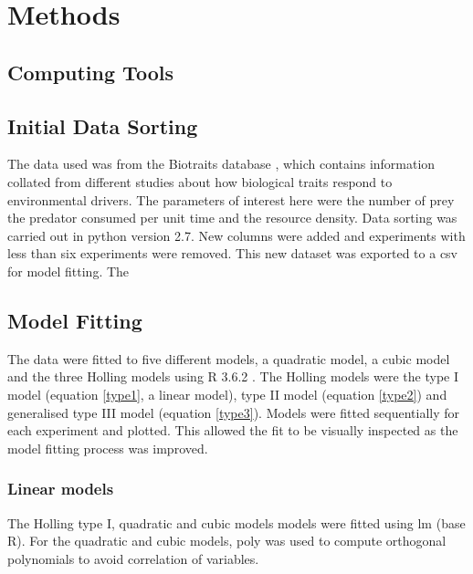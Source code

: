 \documentclass{article}
\begin{document}
%
%
\section{Methods}
\subsection{Computing Tools}
\subsection{Initial Data Sorting}
The data used was from the Biotraits database \parencite{Dell2013}, which contains information collated from different studies about how biological traits respond to environmental drivers. The parameters of interest here were the number of prey the predator consumed per unit time and the resource density. Data sorting was carried out in python version 2.7. New columns were added and experiments with less than six experiments were removed. This new dataset was exported to a csv for model fitting. The
\subsection{Model Fitting}
The data were fitted to five different models, a quadratic model, a cubic model and the three Holling models \parencite{Holling1959} using R 3.6.2 \parencite{RCoreTeam2017}. The Holling models were the type I model (equation \ref{type1}, a linear model), type II model (equation \ref{type2}) and generalised type III model (equation \ref{type3}).
Models were fitted sequentially for each experiment and plotted. This allowed the fit to be visually inspected as the model fitting process was improved.
\subsubsection{Linear models}
 The Holling type I, quadratic and cubic models models were fitted using lm (base R). For the quadratic and cubic models, poly was used to compute orthogonal polynomials to avoid correlation of variables.
\end{document}
